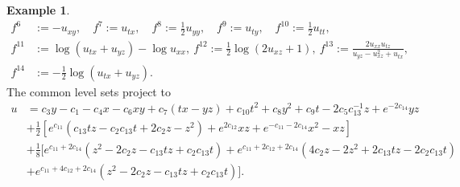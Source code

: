 \documentclass[a4paper, 11pt]{amsart}
\theoremstyle{definition}
\newtheorem{example}[theorem]{Example}
\begin{document}
\begin{example}
\begin{align*}
f^6&:=-u_{xy},\quad f^7:=u_{tx},\quad f^8:=\frac{1}{2}u_{yy},\quad f^9:=u_{ty},\quad f^{10}:=\frac{1}{2}u_{tt},\\
f^{11}&:=\log (u_{tx}+u_{yz})-\log {u_{xx}},~f^{12}:=\frac{1}{2}\log(2u_{xz}+1),~f^{13}:=\frac{2u_{xx}u_{tz}}{u_{yz}-u_{xz}^2+u_{tx}},\\
f^{14}&:=-\frac{1}{2}\log (u_{tx}+u_{yz}).
\end{align*}
The common level sets project to
\begin{align*}
  u&=c_3y-c_1-c_4x-c_6xy+c_7(tx-yz)+c_{10}t^2+c_8y^2+c_9 t-2c_5c_{13}^{-1}z+e^{-2c_{14}}yz\\
  &+\frac{1}{2}[e^{c_{11}}(c_{13}tz-c_2c_{13}t+2c_2z-z^2)+e^{2c_{12}}xz+e^{-c_{11}-2c_{14}}x^2-xz]\\
  &+\frac{1}{8}[e^{c_{11}+2c_{14}}(z^2-2c_2z-c_{13}tz+c_{2}c_{13}t)+e^{c_{11}+2c_{12}+2c_{14}}(4c_2z-2z^2+2c_{13}tz-2c_{2}c_{13}t)
  \\&+e^{c_{11}+4c_{12}+2c_{14}}(z^2-2c_2z-c_{13}tz+c_{2}c_{13}t)].
  \end{align*}
\end{example}
\newpage
\end{document}
